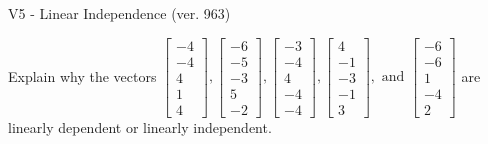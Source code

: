\begin{exercise}
  \begin{exerciseTitle}V5 - Linear Independence (ver. 963)\end{exerciseTitle}
  \begin{exerciseStatement}
    Explain why the vectors \(\left[\begin{array}{r}
-4 \\
-4 \\
4 \\
1 \\
4
\end{array}\right] , \left[\begin{array}{r}
-6 \\
-5 \\
-3 \\
5 \\
-2
\end{array}\right] , \left[\begin{array}{r}
-3 \\
-4 \\
4 \\
-4 \\
-4
\end{array}\right] , \left[\begin{array}{r}
4 \\
-1 \\
-3 \\
-1 \\
3
\end{array}\right] , \text{ and } \left[\begin{array}{r}
-6 \\
-6 \\
1 \\
-4 \\
2
\end{array}\right]\) are linearly dependent or linearly independent.	



\end{exerciseStatement}
\end{exercise}
